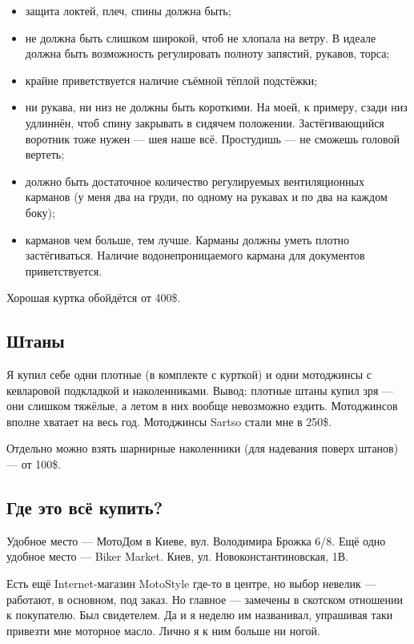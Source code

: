 \documentclass[12pt,a4paper]{article}
\begin{document}
\begin{itemize}
\item защита локтей, плеч, спины должна быть;
\item не должна быть слишком широкой, чтоб не хлопала на ветру.
В идеале должна быть возможность регулировать полноту запястий,
рукавов, торса;
\item крайне приветствуется наличие съёмной тёплой подстёжки;
\item ни рукава, ни низ не должны быть короткими. На моей, к примеру,
сзади низ удлиннён, чтоб спину закрывать в сидячем положении.
Застёгивающийся воротник тоже нужен --- шея наше всё. Простудишь --- не
сможешь головой вертеть;
\item должно быть достаточное количество регулируемых вентиляционных
карманов (у меня два на груди, по одному на рукавах и по два на каждом
боку);
\item карманов чем больше, тем лучше. Карманы должны уметь плотно
застёгиваться. Наличие водонепроницаемого кармана для документов
приветствуется.
\end{itemize}

Хорошая куртка обойдётся от 400\$.

\subsection{Штаны}

Я купил себе одни плотные (в комплекте с курткой) и одни мотоджинсы с
кевларовой подкладкой и наколенниками. Вывод: плотные штаны купил зря ---
они слишком тяжёлые, а летом в них вообще невозможно ездить.
Мотоджинсов вполне хватает на весь год. Мотоджинсы Sartso стали мне в
250\$.

Отдельно можно взять шарнирные наколенники (для надевания поверх
штанов) --- от 100\$.

\subsection{Где это всё купить?}

Удобное место --- МотоДом в Киеве, вул. Володимира Брожка 6/8.
Ещё одно удобное место --- Biker Market. Киев, ул. Новоконстантиновская, 1В.

Есть ещё Internet-магазин MotoStyle где-то в центре, но выбор невелик ---
работают, в основном, под заказ. Но главное --- замечены в скотском
отношении к покупателю. Был свидетелем. Да и я неделю им названивал,
упрашивая таки привезти мне моторное масло. Лично я к ним больше ни
ногой.
\end{document}

